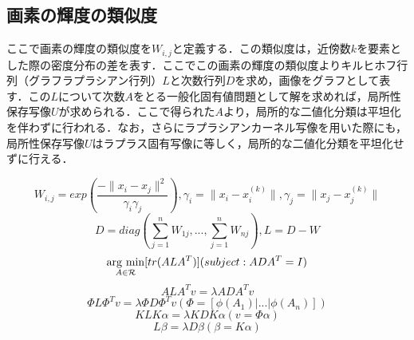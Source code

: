 \documentclass{jsarticle}
\begin{document}
\subsection{画素の輝度の類似度}
\label{画素の輝度の類似度}

ここで画素の輝度の類似度を$W_{i,j}$と定義する．この類似度は，近傍数$k$を要素とした際の密度分布の差を表す．ここでこの画素の輝度の類似度よりキルヒホフ行列（グラフラプラシアン行列）$L$と次数行列$D$を求め，画像をグラフとして表す．この$L$について次数$A$をとる一般化固有値問題として解を求めれば，局所性保存写像$U$が求められる．ここで得られた$A$より，局所的な二値化分類は平坦化を伴わずに行われる．なお，さらにラプラシアンカーネル写像を用いた際にも，局所性保存写像$U$はラプラス固有写像に等しく，局所的な二値化分類を平坦化せずに行える．

\newcommand{\argmin}{\mathop{\rm arg~min}\limits}

\[
W_{i,j} = exp(\frac{-\|x_i - x_j\|^2}{\gamma_i \gamma_j}),
\gamma_i = \|x_i-x_i^{(k)}\|,
\gamma_j = \|x_j-x_j^{(k)}\|
\]
\[
D = diag(\sum_{j=1}^n W_{1j}, ... , \sum_{j=1}^n W_{nj}),
L = D - W
\]
\[
\argmin_{A \in \mathcal{R}} [tr(ALA^T)] (subject: ADA^T=I)
\]
\[
ALA^Tv = \lambda ADA^Tv
\]
\[
\Phi L \Phi^T v = \lambda \Phi D \Phi^T v (\Phi = [\phi(A_1)|...|\phi(A_n)])
\]
\[
KLK\alpha = \lambda KDK \alpha (v=\Phi \alpha)
\]
\[
L \beta = \lambda D \beta (\beta=K \alpha)
\]

\end{document}

